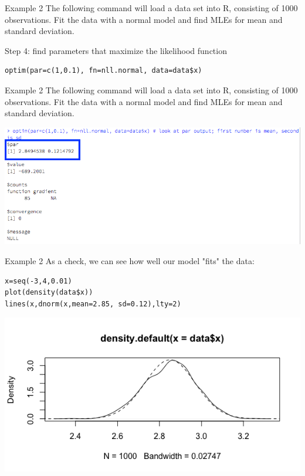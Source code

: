 \documentclass[presentation]{beamer}
\begin{document}
\begin{frame}[fragile,label=sec-22]{Example 2}
 The following command will load a data set into R, consisting of 1000 observations.  Fit the data with a normal model and find MLEs for mean and standard deviation.

\vspace{5mm}

Step 4: find parameters that maximize the likelihood function

\begin{verbatim}
optim(par=c(1,0.1), fn=nll.normal, data=data$x)
\end{verbatim}
\end{frame}


\begin{frame}[label=sec-23]{Example 2}
The following command will load a data set into R, consisting of 1000 observations.  Fit the data with a normal model and find MLEs for mean and standard deviation.

\vspace{5mm}

\includegraphics[width=.9\linewidth]{figures/week2/normalOutput.png}
\end{frame}

\begin{frame}[fragile,label=sec-24]{Example 2}
 As a check, we can see how well our model "fits" the data:

\begin{verbatim}
x=seq(-3,4,0.01)
plot(density(data$x))
lines(x,dnorm(x,mean=2.85, sd=0.12),lty=2)
\end{verbatim}

\includegraphics[width=.9\linewidth]{figures/week2/normalFit.png}
\end{frame}
\end{document}
